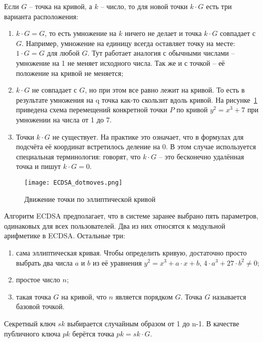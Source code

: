 Если $G$ -- точка на кривой, а $k$ -- число, то для новой точки $k \cdot G$ есть три варианта расположения:

\begin{enumerate}
	\item $k \cdot G = G$, то есть умножение на $k$ ничего не делает и точка $k \cdot G$ совпадает с $G$. Например, умножение на единицу всегда оставляет точку на месте: $1 \cdot G = G$ для любой $G$. Тут работает аналогия с обычными числами -- умножение на 1 не меняет исходного числа. Так же и с точкой -- её положение на кривой не меняется;
	\item $k \cdot G$ не совпадает с $G$, но при этом все равно лежит на кривой. То есть в результате умножения на q точка как-то скользит вдоль кривой. На рисунке~\ref{fig:dot_moves} приведена схема перемещений конкретной точки $P$ по кривой $y^2 = x^3 + 7$ при умножении на числа от 1 до 7.
	\item Точки $k \cdot G$ не существует. На практике это означает, что в формулах для подсчёта её координат встретилось деление на 0. В этом случае используется специальная терминология: говорят, что $k \cdot G$ -- это бесконечно удалённая точка и пишут $k \cdot G = 0$. 
\end{enumerate}

\begin{figure}[H]
	\centering
	\texttt{[image: ECDSA\_dotmoves.png]}
	\caption{Движение точки по эллиптической кривой}
	\label{fig:dot_moves}
\end{figure}

Алгоритм ECDSA предполагает, что в системе заранее выбрано пять параметров, одинаковых для всех пользователей. Два из них относятся к модульной арифметике в ECDSA. Остальные три:

\begin{enumerate}
	\item сама эллиптическая кривая. Чтобы определить кривую, достаточно просто выбрать два числа $a$ и $b$ из её уравнения $y^2 = x^3 + a \cdot x + b$, $4 \cdot a^3 + 27 \cdot b^2 \neq 0$;
	\item простое число $n$;
	\item такая точка $G$ на кривой, что $n$ является порядком $G$. Точка $G$ называется базовой точкой.
\end{enumerate}

Секретный ключ $sk$ выбирается случайным образом от 1 до n-1. В качестве публичного ключа $pk$ берётся точка $pk = sk \cdot G$. 

